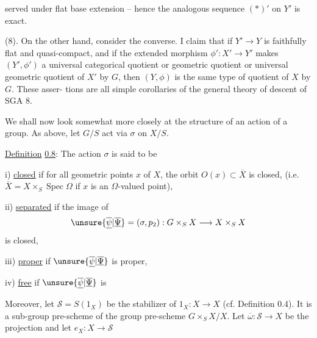served under flat base extension -- hence the analogous sequence $(*)'$ on $Y'$ is exact.

(8). On the other hand, consider the converse. I claim that if $Y'\longrightarrow Y$ is faithfully flat and quasi-compact, and if the extended morphism $\phi':X'\longrightarrow Y'$ makes $(Y',\phi')$ a universal categorical quotient or geometric quotient or universal geometric quotient of $X'$ by $G$, then $(Y,\phi)$ is the same type of quotient of $X$ by $G$. These asser-
tions are all simple corollaries of the general theory of descent of SGA 8.

 We shall now look somewhat more closely at the structure of an action of a group. As above, let $G/S$ act via $\sigma$ on $X/S$.

\uline{Definition} \uline{0.8}: The action $\sigma$ is said to be

i) \uline{closed} if for all geometric points $x$ of $X$, the orbit $O(x)\subset\overline X$ is closed, (i.e. $\overline X=X\times_S\operatorname{Spec}\Omega$ if $x$ is an $\Omega$-valued point),

ii) \uline{separated} if the image of
\[
\unsure{\overline{\underline{\psi}}|\overline{\underline{\Psi}}}=(\sigma,p_2):G\times_S X\longrightarrow X\times_S X
\]
is closed,

iii) \uline{proper} if $\unsure{\overline{\underline{\psi}}|\overline{\underline{\Psi}}}$ is proper,

iv) \uline{free} if $\unsure{\overline{\underline{\psi}}|\overline{\underline{\Psi}}}$ is 

Moreover, let $\mathcal S=S(1_X)$ be the stabilizer of $1_X:X\to X$ (cf. Definition 0.4). It is a sub-group pre-scheme of the group pre-scheme $G\times_S X/X$. Let $\overline\omega:\mathcal S\longrightarrow X$ be the projection and let $e_X:X\longrightarrow\mathcal S$
